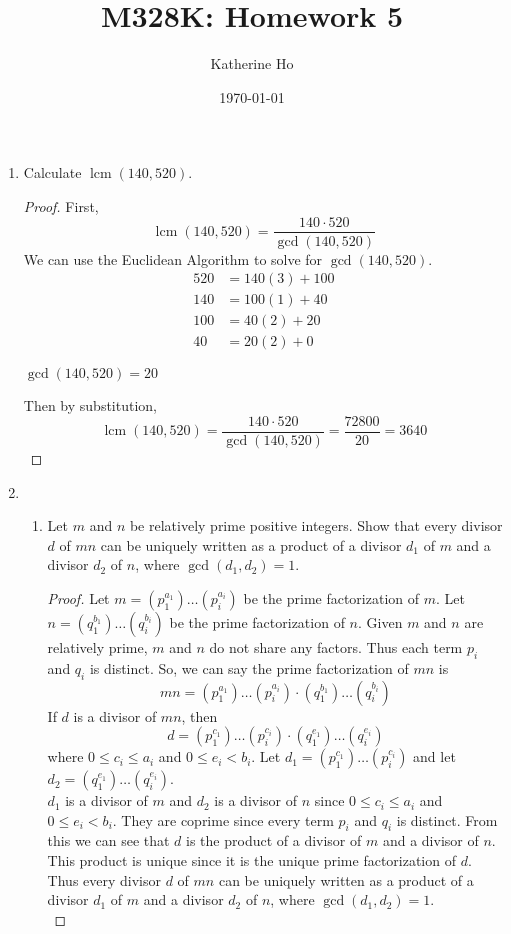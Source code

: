 \documentclass[11pt]{article}
\title{M328K: Homework 5}
\author{Katherine Ho}
\date\today
\theoremstyle{definition}
\begin{document}
\maketitle

\begin{enumerate}
    \item Calculate $\operatorname{lcm}(140,520)$.
    \begin{proof}
        First, \[ \operatorname{lcm}(140,520) = \frac{140\cdot 520}{\gcd(140,520)} \]
        We can use the Euclidean Algorithm to solve for $\gcd(140,520)$.
        \begin{align*}
            520 &= 140(3) + 100 \\
            140 &= 100(1) + 40 \\
            100 &= 40(2) + 20 \\
            40 &= 20(2) + 0             
        \end{align*}
        \begin{center}
            $\gcd(140,520) = 20$
        \end{center}
        Then by substitution,
        \[
            \operatorname{lcm}(140,520) = \frac{140\cdot 520}{\gcd(140,520)} = \frac{72800}{20} = 3640
        \]
    \end{proof}

    \item \begin{enumerate}
        \item Let $m$ and $n$ be relatively prime positive integers. Show that every divisor $d$ of $m n$ can be uniquely written as a product of a divisor $d_1$ of $m$ and a divisor $d_2$ of $n$, where $\gcd(d_1,d_2) = 1$.
        \begin{proof}
            Let $m = (p_1^{a_1})\dots(p_i^{a_i})$ be the prime factorization of $m$. 
            Let $n = (q_1^{b_1})\dots(q_i^{b_i})$ be the prime factorization of $n$.
            Given $m$ and $n$ are relatively prime, $m$ and $n$ do not share any factors.
            Thus each term $p_i$ and $q_i$ is distinct. So, we can say the prime factorization 
            of $mn$ is
            \[ mn = (p_1^{a_1})\dots(p_i^{a_i}) \cdot (q_1^{b_1})\dots(q_i^{b_i}) \]
            If $d$ is a divisor of $mn$, then 
            \[ d = (p_1^{c_1})\dots(p_i^{c_i}) \cdot (q_1^{e_1})\dots(q_i^{e_i}) \]
            where $0\le c_i \le a_i$ and $0\le e_i < b_i$. 
            Let $d_1 = (p_1^{c_1})\dots(p_i^{c_i})$ and let $d_2 = (q_1^{e_1})\dots(q_i^{e_i})$. \\
            $d_1$ is a divisor of $m$ and $d_2$ is a divisor of $n$ since $0\le c_i \le a_i$ and $0\le e_i < b_i$.
            They are coprime since every term $p_i$ and $q_i$ is distinct.
            From this we can see that $d$ is the product of a divisor of $m$ and a divisor of $n$. 
            This product is unique since it is the unique prime factorization of $d$.
            Thus every divisor $d$ of $m n$ can be uniquely written as a product of a 
            divisor $d_1$ of $m$ and a divisor $d_2$ of $n$, where $\gcd(d_1,d_2) = 1$. \\
        \end{proof}
        

\end{enumerate}
\end{enumerate}
\end{document}
